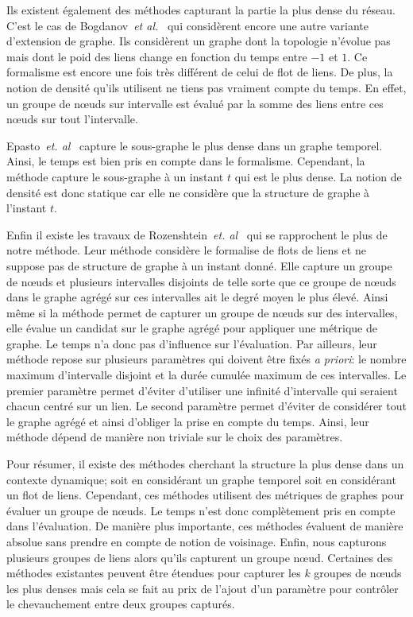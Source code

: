 Ils existent également des méthodes capturant la partie la plus dense du réseau.
C'est le cas de Bogdanov~\emph{et al.}~\cite{Bogdanov2011} qui considèrent encore une autre variante d'extension de graphe.
Ils considèrent un graphe dont la topologie n'évolue pas mais dont le poid des liens change en fonction du temps entre $-1$ et $1$.
Ce formalisme est encore une fois très différent de celui de flot de liens.
De plus, la notion de densité qu'ils utilisent ne tiens pas vraiment compte du temps.
En effet, un groupe de n\oe uds sur intervalle est évalué par la somme des liens entre ces n\oe uds sur tout l'intervalle.


Epasto~\emph{et. al}~\cite{Epasto2015} capture le sous-graphe le plus dense dans un graphe temporel.
Ainsi, le temps est bien pris en compte dans le formalisme.
Cependant, la méthode capture le sous-graphe à un instant $t$ qui est le plus dense.
La notion de densité est donc statique car elle ne considère que la structure de graphe à l'instant $t$.


Enfin il existe les travaux de Rozenshtein~\emph{et. al}~\cite{rozenshtein2014} qui se rapprochent le plus de notre méthode.
Leur méthode considère le formalise de flots de liens et ne suppose pas de structure de graphe à un instant donné.
Elle capture un groupe de n\oe uds et plusieurs intervalles disjoints de telle sorte que ce groupe de n\oe uds dans le graphe agrégé sur ces intervalles ait le degré moyen le plus élevé.
Ainsi même si la méthode permet de capturer un groupe de n\oe uds sur des intervalles, elle évalue un candidat sur le graphe agrégé pour appliquer une métrique de graphe.
Le temps n'a donc pas d'influence sur l'évaluation.
Par ailleurs, leur méthode repose sur plusieurs paramètres qui doivent être fixés \emph{a priori}: le nombre maximum d'intervalle disjoint et la durée cumulée maximum de ces intervalles.
Le premier paramètre permet d'éviter d'utiliser une infinité d'intervalle qui seraient chacun centré sur un lien.
Le second paramètre permet d'éviter de considérer tout le graphe agrégé et ainsi d'obliger la prise en compte du temps.
Ainsi, leur méthode dépend de manière non triviale sur le choix des paramètres.

\bigskip

Pour résumer, il existe des méthodes cherchant la structure la plus dense dans un contexte dynamique; soit en considérant un graphe temporel soit en considérant un flot de liens.
Cependant, ces méthodes utilisent des métriques de graphes pour évaluer un groupe de n\oe uds.
Le temps n'est donc complètement pris en compte dans l'évaluation.
De manière plus importante, ces méthodes évaluent de manière absolue sans prendre en compte de notion de voisinage.
Enfin, nous capturons plusieurs groupes de liens alors qu'ils capturent un groupe n\oe ud.
Certaines des méthodes existantes peuvent être étendues pour capturer les $k$ groupes de n\oe uds les plus denses mais cela se fait au prix de l'ajout d'un paramètre pour contrôler le chevauchement entre deux groupes capturés.


